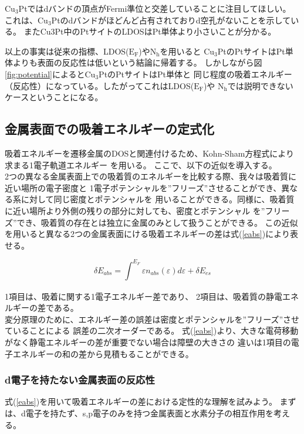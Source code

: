\documentclass[12pt]{ltjsarticle}
\begin{document}
$\text{Cu}_\text{3}$Ptではdバンドの頂点がFermi準位と交差していることに注目してほしい。
これは、$\text{Cu}_\text{3}$Ptのdバンドがほどんど占有されておりd空孔がないことを示している。
またCu3Pt中のPtサイトのLDOSはPt単体より小さいことが分かる。

以上の事実は従来の指標、LDOS($\text{E}_\text{F}$)や$\text{N}_\text{h}$を用いると
$\text{Cu}_\text{3}$PtのPtサイトはPt単体よりも表面の反応性は低いという結論に帰着する。
しかしながら図\ref{fig:potential}によると$\text{Cu}_\text{3}$PtのPtサイトはPt単体と
同じ程度の吸着エネルギー（反応性）になっている。したがってこれはLDOS($\text{E}_\text{F}$)や
$\text{N}_\text{h}$では説明できないケースということになる。

\subsection{金属表面での吸着エネルギーの定式化}
吸着エネルギーを遷移金属のDOSと関連付けるため、Kohn-Sham方程式により求まる1電子軌道エネルギー
を用いる。
ここで、以下の近似を導入する。\\
2つの異なる金属表面上での吸着質のエネルギーを比較する際、我々は吸着質に近い場所の電子密度と
1電子ポテンシャルを”フリーズ”させることができ、異なる系に対して同じ密度とポテンシャルを
用いることができる。同様に、吸着質に近い場所より外側の残りの部分に対しても、密度とポテンシャル
を”フリーズ”でき、吸着質の存在とは独立に金属のみとして扱うことができる。
この近似を用いると異なる2つの金属表面にける吸着エネルギーの差は式(\ref{eabs})により表せる。

\begin{equation}
    \label{eabs}
    \delta E_{abs} = \int_{}^{E_F} \varepsilon n_{abs}(\varepsilon) d\varepsilon + 
    \delta E_{es}
\end{equation}

1項目は、吸着に関する1電子エネルギー差であり、
2項目は、吸着質の静電エネルギーの差である。\\
変分原理のために、エネルギー差の誤差は密度とポテンシャルを”フリーズ”させていることによる
誤差の二次オーダーである。
式(\ref{eabs})より、大きな電荷移動がなく静電エネルギーの差が重要でない場合は障壁の大きさの
違いは1項目の電子エネルギーの和の差から見積もることができる。

\subsubsection{d電子を持たない金属表面の反応性}
式(\ref{eabs})を用いて吸着エネルギーの差における定性的な理解を試みよう。
まずは、d電子を持たず、s,p電子のみを持つ金属表面と水素分子の相互作用を考える。
\end{document}
